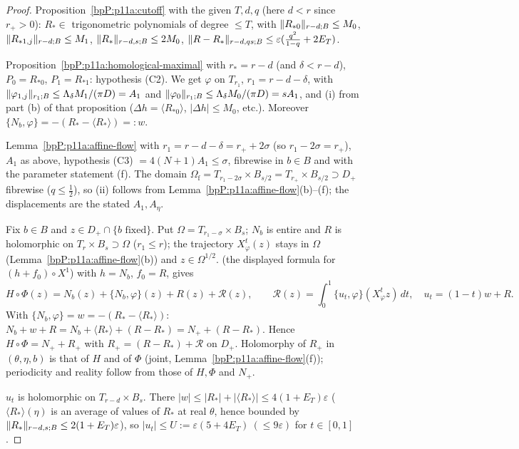 \begin{proof}
\label{stepP:p11a:cs-cutoff} Proposition~\ref{bpP:p11a:cutoff} with the given $T,d,q$ (here $d<r$ since $r_+>0$): $R_*\in$ trigonometric polynomials of degree $\le T$, with $\lVert R_{*0}\rVert_{r-d;B}\le M_0$, $\lVert R_{*1,j}\rVert_{r-d;B}\le M_1$, $\lVert R_*\rVert_{r-d,s;B}\le2M_0$, $\lVert R-R_*\rVert_{r-d,qs;B}\le\varepsilon(\frac{q^2}{1-q}+2E_T)$.

\label{stepP:p11a:cs-hom} Proposition~\ref{bpP:p11a:homological-maximal} with $r_*=r-d$ (and $\delta<r-d$), $P_0=R_{*0}$, $P_1=R_{*1}$: hypothesis (C2). We get $\varphi$ on $T_{r_1}$, $r_1=r-d-\delta$, with $\lVert \varphi_{1,j}\rVert_{r_1;B}\le\Lambda_{\delta} M_1/(\pi D)=A_1$ and $\lVert \varphi_0\rVert_{r_1;B}\le\Lambda_{\delta} M_0/(\pi D)=sA_1$, and (i) from part (b) of that proposition ($\Delta h=\langle R_{*0}\rangle$, $\lvert\Delta h\rvert\le M_0$, etc.). Moreover $\{N_b,\varphi\}=-(R_*-\langle R_*\rangle)=:w$.

\label{stepP:p11a:cs-flow} Lemma~\ref{bpP:p11a:affine-flow} with $r_1=r-d-\delta=r_++2\sigma$ (so $r_1-2\sigma=r_+$), $A_1$ as above, hypothesis (C3) $=4(N+1)A_1\le\sigma$, fibrewise in $b\in B$ and with the parameter statement (f). The domain $\Omega_{\mathrm f}=T_{r_1-2\sigma}\times B_{s/2}=T_{r_+}\times B_{s/2}\supset D_+$ fibrewise ($q\le\frac12$), so (ii) follows from Lemma~\ref{bpP:p11a:affine-flow}(b)--(f); the displacements are the stated $A_1,A_\eta$.

\label{stepP:p11a:cs-taylor} Fix $b\in B$ and $z\in D_+\cap\{b\text{ fixed}\}$. Put $\Omega=T_{r_1-\sigma}\times B_s$; $N_b$ is entire and $R$ is holomorphic on $T_r\times B_s\supset\Omega$ ($r_1\le r$); the trajectory $X^t_\varphi(z)$ stays in $\Omega$ (Lemma~\ref{bpP:p11a:affine-flow}(b)) and $z\in\Omega^{1/2}$.  (the displayed formula for $(h+f_0)\circ X^1$) with $h=N_b$, $f_0=R$, gives
\[H\circ\Phi(z)=N_b(z)+\{N_b,\varphi\}(z)+R(z)+\mathcal R(z),\qquad \mathcal R(z)=\int_0^1\{u_t,\varphi\}(X^t_\varphi z)\,dt,\quad u_t=(1-t)w+R.\]
With $\{N_b,\varphi\}=w=-(R_*-\langle R_*\rangle)$: $N_b+w+R=N_b+\langle R_*\rangle+(R-R_*)=N_++(R-R_*)$. Hence $H\circ\Phi=N_++R_+$ with $R_+=(R-R_*)+\mathcal R$ on $D_+$. Holomorphy of $R_+$ in $(\theta,\eta,b)$ is that of $H$ and of $\Phi$ (joint, Lemma~\ref{bpP:p11a:affine-flow}(f)); periodicity and reality follow from those of $H,\Phi$ and $N_+$.

\label{stepP:p11a:cs-u} $u_t$ is holomorphic on $T_{r-d}\times B_s$. There $\lvert w\rvert\le\lvert R_*\rvert+\lvert\langle R_*\rangle\rvert\le4(1+E_T)\varepsilon$ ($\langle R_*\rangle(\eta)$ is an average of values of $R_*$ at real $\theta$, hence bounded by $\lVert R_*\rVert_{r-d,s;B}\le2(1+E_T)\varepsilon$), so $\lvert u_t\rvert\le U:=\varepsilon(5+4E_T)\ (\le9\varepsilon)$ for $t\in[0,1]$.


\end{proof}
